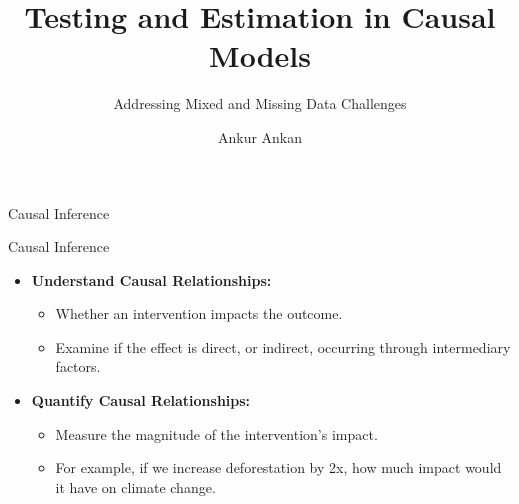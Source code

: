 \documentclass[aspectratio=169]{beamer}
\begin{document}
\title{Testing and Estimation in Causal Models}
\subtitle{Addressing Mixed and Missing Data Challenges}
\author{Ankur Ankan}
\date{}

\maketitle

\begin{frame}{Causal Inference}

	\vspace{2em}

\end{frame}

\begin{frame}{Causal Inference}

	\vspace{2em}

	\begin{itemize}
		\item \textbf{Understand Causal Relationships: }
			\begin{itemize}
				\item Whether an intervention impacts the outcome.
				\item Examine if the effect is direct, or indirect, occurring through intermediary factors.
			\end{itemize}
		\item \textbf{Quantify Causal Relationships: }
			\begin{itemize}
				\item Measure the magnitude of the intervention's impact.
				\item For example, if we increase deforestation by 2x, how much impact would it have on climate change.
			\end{itemize}
	\end{itemize}
\end{frame}
\end{document}
